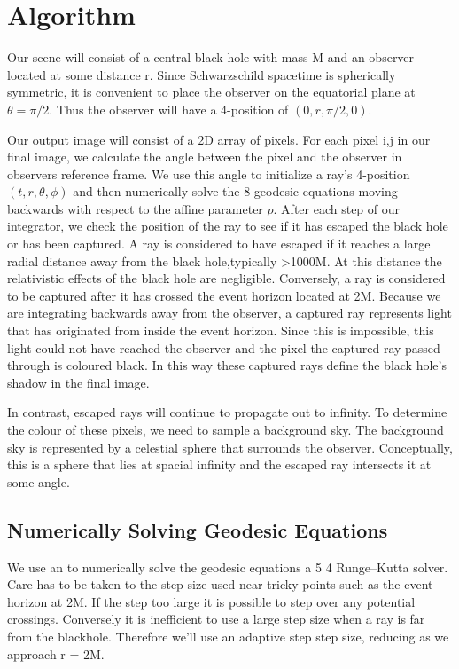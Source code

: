 \documentclass[11pt,a4paper,fleqn]{article}
\begin{document}
\section{Algorithm}

Our scene will consist of a central black hole with mass M and an observer located at some distance r. Since Schwarzschild spacetime is spherically symmetric, it is convenient to place the observer on the equatorial plane at $\theta = \pi/2 $. Thus the observer will have a 4-position of $(0,r,\pi/2,0)$.

Our output image will consist of a 2D array of pixels. For each pixel i,j in our final image, we calculate the angle between the pixel and the observer in observers reference frame. We use this angle to initialize a ray's 4-position $(t,r,\theta,\phi)$ and then numerically solve the 8 geodesic equations moving backwards with respect to the affine parameter $p$. After each step of our integrator, we check the position of the ray to see if it has escaped the black hole or has been captured. A ray is considered to have escaped if it reaches a large radial distance away from the black hole,typically >1000M. At this distance the relativistic effects of the black hole are negligible. Conversely, a ray is considered to be captured after it has crossed the event horizon located at 2M. Because we are integrating backwards away from the observer, a captured ray represents light that has originated from inside the event horizon. Since this is impossible, this light could not have reached the observer and the pixel the captured ray passed through is coloured black. In this way these captured rays define the black hole's shadow in the final image.

In contrast, escaped rays will continue to propagate out to infinity. To determine the colour of these pixels, we need to sample a background sky. The background sky is represented by a celestial sphere that surrounds the observer. Conceptually, this is a sphere that lies at spacial infinity and the escaped ray intersects it at some angle. 


\subsection{Numerically Solving Geodesic Equations}
We use an to numerically solve the geodesic equations a 5 4 Runge–Kutta solver. Care has to be taken to the step size used near tricky points such as the event horizon at 2M. If the step too large it is possible to step over any potential crossings. Conversely it is inefficient to use a large step size when a ray is far from the blackhole.  Therefore we'll use an adaptive step step size, reducing as we approach r = 2M.  
\end{document}
